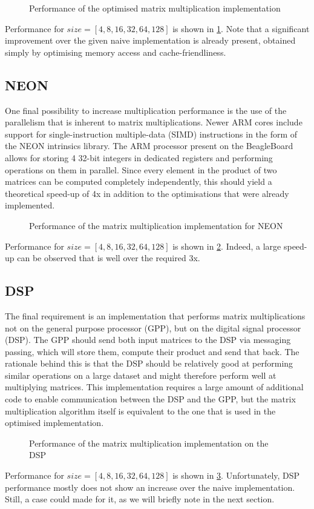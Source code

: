 \documentclass[final]{article}
\begin{document}
\begin{figure}[H]
	\centering
	
	\caption{Performance of the optimised matrix multiplication implementation}
	\label{fig:optimised}
\end{figure}

Performance for $size = [4, 8, 16, 32, 64, 128]$ is shown in \cref{fig:optimised}.
Note that a significant improvement over the given naive implementation is already present, obtained simply by optimising memory access and cache-friendliness.

\subsection{NEON}
One final possibility to increase multiplication performance is the use of the parallelism that is inherent to matrix multiplications.
Newer ARM cores include support for single-instruction multiple-data (SIMD) instructions in the form of the NEON intrinsics library.
The ARM processor present on the BeagleBoard allows for storing 4 32-bit integers in dedicated registers and performing operations on them in parallel.
Since every element in the product of two matrices can be computed completely independently, this should yield a theoretical speed-up of 4x in addition to the optimisations that were already implemented.

\begin{figure}[H]
	\centering
	
	\caption{Performance of the matrix multiplication implementation for NEON}
	\label{fig:neon}
\end{figure}

Performance for $size = [4, 8, 16, 32, 64, 128]$ is shown in \cref{fig:neon}.
Indeed, a large speed-up can be observed that is well over the required 3x.

\subsection{DSP}
The final requirement is an implementation that performs matrix multiplications not on the general purpose processor (GPP), but on the digital signal processor (DSP).
The GPP should send both input matrices to the DSP via messaging passing, which will store them, compute their product and send that back.
The rationale behind this is that the DSP should be relatively good at performing similar operations on a large dataset and might therefore perform well at multiplying matrices.
This implementation requires a large amount of additional code to enable communication between the DSP and the GPP, but the matrix multiplication algorithm itself is equivalent to the one that is used in the optimised implementation.

\begin{figure}[H]
	\centering
	
	\caption{Performance of the matrix multiplication implementation on the DSP}
	\label{fig:dsp}
\end{figure}

Performance for $size = [4, 8, 16, 32, 64, 128]$ is shown in \cref{fig:dsp}.
Unfortunately, DSP performance mostly does not show an increase over the naive implementation. Still, a case could made for it, as we will briefly note in the next section.
\end{document}
